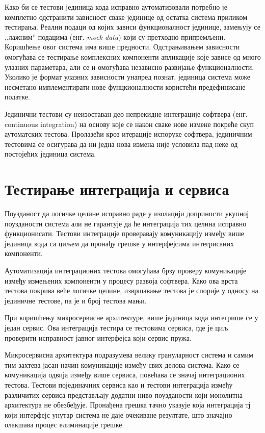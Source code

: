 \documentclass[12pt,oneside]{memoir}
\begin{document}
Како би се тестови јединица кода исправно аутоматизовали потребно је комплетно одстранити зависност сваке јединице од остатка система приликом тестирања. Реални подаци од којих зависи функционалност јединице, замењују се ,,лажним” подацима (енг.\textit{ mock data}) који су претходно припремљени. Коришћење овог система има више предности. Одстрањивањем зависности омогућава се тестирање комплексних компоненти апликације које зависе од много улазних параметара, али се и омогућава независно развијање функционалности. Уколико је формат улазних зависности унапред познат, јединица система може несметано имплементирати нове фунцкионалности користећи предефинисане податке.

Јединични тестови су неизоставан део непрекидне интеграције софтвера (енг. continuous integration) на основу које се након сваке нове измене покреће скуп аутоматских тестова. Пролазећи кроз итерације испоруке софтвера, јединичним тестовима се осигурава да ни једна нова измена није условила пад неке од постојећих јединица система.

\section{Тестирање интеграција и сервиса}

Поузданост да логичке целине исправно раде у изолацији доприности укупној поузданости система али не гарантује да ће интеграција тих целина исправно функционисати. Тестови интеграције проверавају комуникацију између више јединица кода са циљем да пронађу грешке у интерфејсима интегрисаних компоненти.

Аутоматизација интеграционих тестова омогућава брзу проверу комуникације између измењених компоненти у процесу развоја софтвера. Како ова врста тестова покрива веће логичке целине, извршавање тестова је спорије у односу на јединичне тестове, па је и број тестова мањи. 

При коришћењу микросервисне архитектуре, више јединица кода интегрише се у један сервис. Ова интеграција тестира се тестовима сервиса, где је циљ проверити исправност јавног интерфејса који сервис пружа. 

Микросервисна архитектура подразумева велику грануларност система и самим тим захтева јасан начин комуникације између свих делова система. Како се комуникација одвија између више сервиса, повећава се значај интеграционих тестова. Тестови појединачних сервиса као и тестови интеграција између различитих сервиса представљају додатни ниво поузданости који монолитна архитектура не обезбеђује. Пронађена грешка тачно указује која интеграција тј који интерфејс унутар система не даје очекиване резултате, што значајно олакшава процес елиминације грешке.
\end{document}

